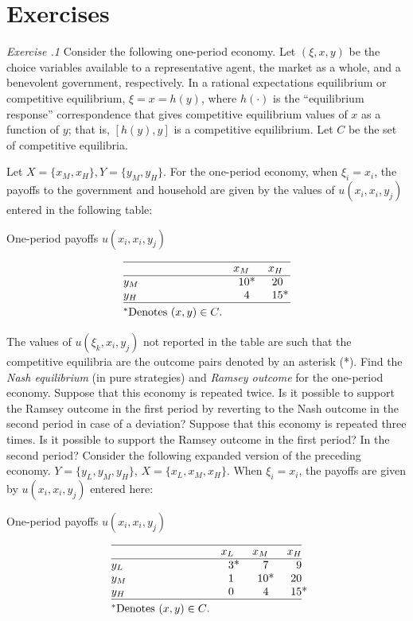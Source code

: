 \section{Exercises}
\showchaptIDtrue
\showsectIDtrue
\medskip
\smallskip\noindent
{\it Exercise  \the\chapternum.1}\quad
 Consider the following one-period economy.  Let
$(\xi, x, y)$ be the choice variables available to a representative
agent, the market as a whole, and a benevolent government,
respectively.  In a rational expectations equilibrium or
competitive equilibrium,
$\xi = x = h(y)$, where $h(\cdot)$ is the ``equilibrium response''
correspondence that gives competitive equilibrium values of $x$
as a function of $y$; that is, $[h(y),y]$ is a competitive equilibrium.
Let $C$ be the set of competitive equilibria.

Let $X= \{x_M,x_H\}, Y = \{y_M,y_H\}$. For the one-period economy,
when $\xi_i = x_i$, the payoffs to the government and household
are given by the values of $u(x_i,x_i,y_j)$ entered in
the following table:
\vfil\eject

\centerline{One-period payoffs $u(x_i,x_i,y_j)$}
$$\vbox{\offinterlineskip
\hrule
\halign{\strut #\hfil &\quad \hfil# &\quad \hfil# \cr
& $x_M$ & $x_H$ \cr \noalign{\hrule}
$y_M$ & $10\rlap{*}$ & $20$ \cr
$y_H$ & $4$ & $15\rlap{*}$ \cr\noalign{\hrule}
\noalign{\smallskip}
\hbox{$^\ast$Denotes $(x,y)\in C$.}\cr
              }}$$




\noindent
The values of $u(\xi_k,x_i,y_j)$ not reported in the table
are such that the competitive equilibria are the outcome pairs
denoted by an asterisk (*).
\medskip
{}  Find the {\it Nash equilibrium\/} (in pure
strategies) and {\it Ramsey outcome\/} for the one-period economy.
\smallskip
{} Suppose that this economy is repeated twice.  Is it
possible to support the Ramsey outcome in the first period by
reverting to the Nash outcome in the second period
in case of a deviation?
\smallskip
{} Suppose that this economy is repeated three times.  Is
it possible to support the Ramsey outcome in the first period?
In the second period?
\medskip
Consider the following expanded version of the preceding economy.
  $Y=\{y_L, y_M,y_H\}$, $X=\{ x_L,x_M,x_H\}$. When $\xi_i = x_i$,
the payoffs are given by $u(x_i,x_i,y_j)$ entered here:
\smallskip

\centerline{One-period payoffs  $u(x_i,x_i,y_j)$}
$$\vbox{\offinterlineskip
\hrule
\halign{\strut #\hfil &\quad \hfil# &\quad \hfil# &\quad \hfil#\cr
& $x_L$ & $x_M$ & $x_H$\cr \noalign{\hrule}
$y_L$ & $3\rlap{*}$ & $7$ & $9$\cr
$y_M$ & $1$ & $10\rlap{*}$ & 20\cr
$y_H$ & $0$ & $4$ & $15\rlap{*}$\cr \noalign{\hrule}
\noalign{\smallskip}
\hbox{$^\ast$Denotes $(x,y)\in C$.}\cr
         }}$$


